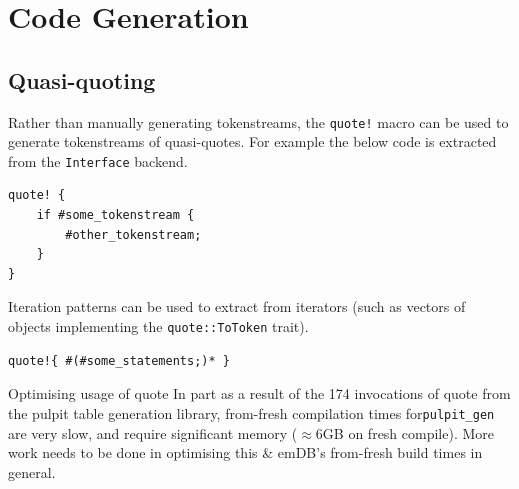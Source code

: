 \section{Code Generation}
\subsection{Quasi-quoting}
Rather than manually generating tokenstreams, the \texttt{quote!} macro can be used to generate tokenstreams of quasi-quotes. For example the below code is extracted from the \texttt{Interface} backend.
\begin{verbatim}
quote! {
    if #some_tokenstream {
        #other_tokenstream;
    }
}
\end{verbatim}
Iteration patterns can be used to extract from iterators (such as vectors of objects implementing the \texttt{quote::ToToken} trait).
\begin{verbatim}
quote!{ #(#some_statements;)* }
\end{verbatim}

\begin{futurebox}{Optimising usage of quote}
    In part as a result of the 174 invocations of quote from the pulpit table generation library, from-fresh compilation times for\texttt{pulpit_gen} are very slow, and require significant memory ($\approx 6$GB on fresh compile).
    More work needs to be done in optimising this \& emDB's from-fresh build times in general.
\end{futurebox}
